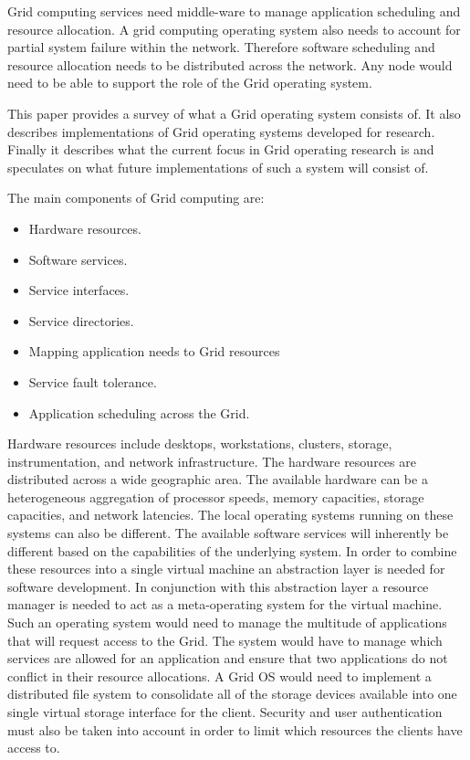 \documentclass[conference]{IEEEtran}
\begin{document}

Grid computing services need middle-ware to manage application scheduling and resource allocation. A grid computing operating system also needs to account for partial system failure within the network. Therefore software scheduling and resource allocation needs to be distributed across the network. Any node would need to be able to support the role of the Grid operating system. 

This paper provides a survey of what a Grid operating system consists of. It also describes implementations of Grid operating systems developed for research. Finally it describes what the current focus in Grid operating research is and speculates on what future implementations of such a system will consist of.  


The main components of Grid computing are:
\begin{itemize}
\item Hardware resources.
\item Software services.
\item Service interfaces.
\item Service directories.
\item Mapping application needs to Grid resources 
\item Service fault tolerance.
\item Application scheduling across the Grid.
\end{itemize}

Hardware resources include desktops, workstations, clusters, storage, instrumentation, and network infrastructure. The hardware resources are distributed across a wide geographic area. The available hardware can be a heterogeneous aggregation of processor speeds, memory capacities, storage capacities, and network latencies. The local operating systems running on these systems can also be different. The available software services will inherently be different based on the capabilities of the underlying system. In order to combine these resources into a single virtual machine an abstraction layer is needed for software development. In conjunction with this abstraction layer a resource manager is needed to act as a meta-operating system for the virtual machine. Such an operating system would need to manage the multitude of applications that will request access to the Grid. The system would have to manage which services are allowed for an application and ensure that two applications do not conflict in their resource allocations. A Grid OS would need to implement a distributed file system to consolidate all of the storage devices available into one single virtual storage interface for the client. Security and user authentication must also be taken into account in order to limit which resources the clients have access to.  
\end{document}
